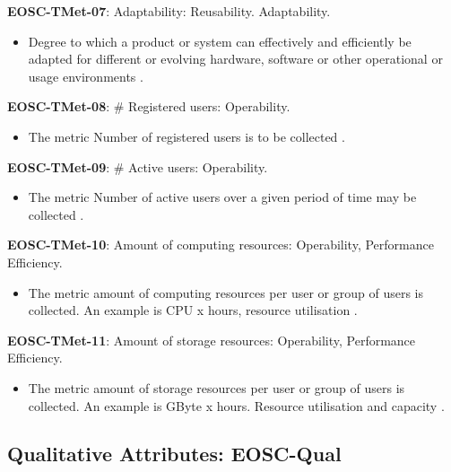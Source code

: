 \textbf{EOSC-TMet-07}: Adaptability: Reusability. Adaptability.

\begin{itemize}
    \item Degree to which a product or system can effectively and efficiently be adapted for different or evolving hardware, software or other operational or usage environments \cite{iso_25010_2011_2017,gillies_modelling_1992,boehm_quantitative_1976}.
\end{itemize}

\textbf{EOSC-TMet-08}: \# Registered users: Operability.

\begin{itemize}
    \item The metric Number of registered users is to be collected \cite{orviz_fernandez_eosc-synergy_2020}.
\end{itemize}

\textbf{EOSC-TMet-09}: \# Active users: Operability.

\begin{itemize}
    \item The metric Number of active users over a given period of time may be collected \cite{orviz_fernandez_eosc-synergy_2020}.
\end{itemize}

\textbf{EOSC-TMet-10}: Amount of computing resources: Operability, Performance Efficiency.

\begin{itemize}
    \item The metric amount of computing resources per user or group of users is collected. An example is CPU x hours, resource utilisation \cite{iso_25010_2011_2017,orviz_fernandez_eosc-synergy_2020}.
\end{itemize}

\textbf{EOSC-TMet-11}: Amount of storage resources: Operability, Performance Efficiency.

\begin{itemize}
    \item The metric amount of storage resources per user or group of users is collected. An example is GByte x hours. Resource utilisation and capacity \cite{iso_25010_2011_2017,orviz_fernandez_eosc-synergy_2020}.
\end{itemize}

\subsection{Qualitative Attributes: EOSC-Qual}

